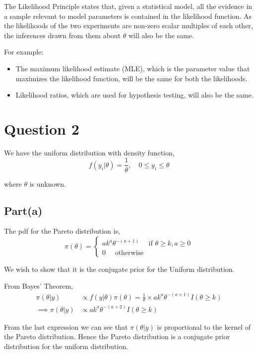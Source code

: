 \documentclass[a4paper]{article}
\begin{document}
The Likelihood Principle states that, given a statistical model, all the evidence in a sample relevant to model parameters is contained in the likelihood function. As the likelihoods of the two experiments are non-zero scalar multiples of each other, the inferences drawn from them about $\theta$ will also be the same.

For example:
\begin{itemize}
    \item The maximum likelihood estimate (MLE), which is the parameter value that maximizes the likelihood function, will be the same for both the likelihoods.
    \item Likelihood ratios, which are used for hypothesis testing, will also be the same.
\end{itemize}

\newpage

\section*{Question 2}

We have the uniform distribution with density function,
\[f(y_i|\theta) = \frac{1}{\theta}, \quad 0 \leq y_i \leq \theta \]

where \(\theta\) is unknown.

\subsection*{Part(a)}

The pdf for the Pareto distribution is,
\[\displaystyle
    \pi(\theta) = \begin{cases}
        a k^{a} \theta^{-(a+1)} \quad \text{ if } \theta \geq k, a \geq 0\\
        0 \quad \text{ otherwise }
    \end{cases}
\]

We wish to show that it is the conjugate prior for the Uniform distribution.

From Bayes' Theorem,
\begin{align*}
    \pi(\theta|y) &\varpropto f(y|\theta) \pi(\theta) 
                = \frac{1}{\theta} \times a k^{a} \theta^{-(a+1)} I(\theta \geq k) \\
    \implies \pi(\theta|y) &\varpropto a k^{a} \theta^{-(a+2)} I(\theta \geq k)
\end{align*}

From the last expression we can see that \(\pi(\theta|y)\) is proportional to the kernel of the Pareto distribution. Hence the Pareto distribution is a conjugate prior distribution for the uniform distribution.
\end{document}
